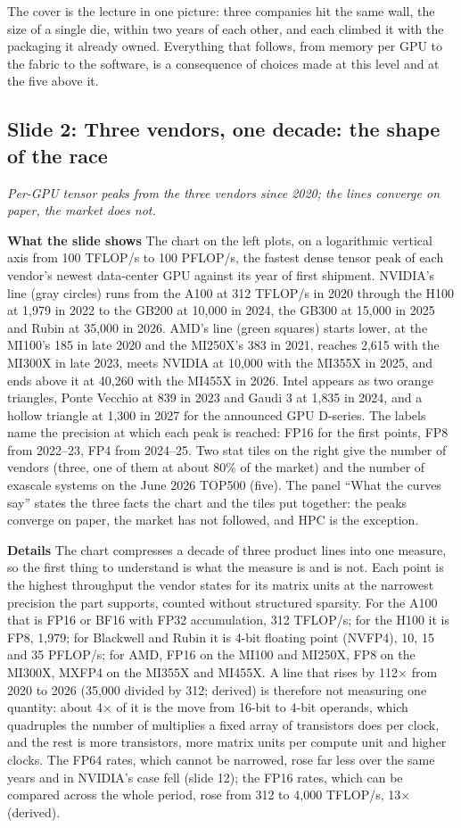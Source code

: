 \documentclass[11pt,letterpaper]{article}
\newcommand{\slide}[3]{%
  \subsection[Slide #1: #2]{Slide #1: #2}%
  {\color{muted}\itshape #3\par}\medskip}
\newcommand{\para}[1]{\medskip\noindent\textbf{#1}\quad}
\newenvironment{intuition}{\begin{tcolorbox}[intuitionbox]}{\end{tcolorbox}}
\begin{document}
\begin{intuition}
The cover is the lecture in one picture: three companies hit the same wall, the size of a single die, within two years of each other, and each climbed it with the packaging it already owned. Everything that follows, from memory per GPU to the fabric to the software, is a consequence of choices made at this level and at the five above it.
\end{intuition}

\slide{2}{Three vendors, one decade: the shape of the race}{Per-GPU tensor peaks from the three vendors since 2020; the lines converge on paper, the market does not.}

\para{What the slide shows} The chart on the left plots, on a logarithmic vertical axis from 100 TFLOP/s to 100 PFLOP/s, the fastest dense tensor peak of each vendor's newest data-center GPU against its year of first shipment. NVIDIA's line (gray circles) runs from the A100 at 312 TFLOP/s in 2020 through the H100 at 1{,}979 in 2022 to the GB200 at 10{,}000 in 2024, the GB300 at 15{,}000 in 2025 and Rubin at 35{,}000 in 2026. AMD's line (green squares) starts lower, at the MI100's 185 in late 2020 and the MI250X's 383 in 2021, reaches 2{,}615 with the MI300X in late 2023, meets NVIDIA at 10{,}000 with the MI355X in 2025, and ends above it at 40{,}260 with the MI455X in 2026. Intel appears as two orange triangles, Ponte Vecchio at 839 in 2023 and Gaudi 3 at 1{,}835 in 2024, and a hollow triangle at 1{,}300 in 2027 for the announced GPU D-series. The labels name the precision at which each peak is reached: FP16 for the first points, FP8 from 2022--23, FP4 from 2024--25. Two stat tiles on the right give the number of vendors (three, one of them at about 80\% of the market) and the number of exascale systems on the June 2026 TOP500 (five). The panel ``What the curves say'' states the three facts the chart and the tiles put together: the peaks converge on paper, the market has not followed, and HPC is the exception.

\para{Details} The chart compresses a decade of three product lines into one measure, so the first thing to understand is what the measure is and is not. Each point is the highest throughput the vendor states for its matrix units at the narrowest precision the part supports, counted without structured sparsity. For the A100 that is FP16 or BF16 with FP32 accumulation, 312 TFLOP/s; for the H100 it is FP8, 1{,}979; for Blackwell and Rubin it is 4-bit floating point (NVFP4), 10, 15 and 35 PFLOP/s; for AMD, FP16 on the MI100 and MI250X, FP8 on the MI300X, MXFP4 on the MI355X and MI455X. A line that rises by 112$\times$ from 2020 to 2026 (35{,}000 divided by 312; derived) is therefore not measuring one quantity: about 4$\times$ of it is the move from 16-bit to 4-bit operands, which quadruples the number of multiplies a fixed array of transistors does per clock, and the rest is more transistors, more matrix units per compute unit and higher clocks. The FP64 rates, which cannot be narrowed, rose far less over the same years and in NVIDIA's case fell (slide 12); the FP16 rates, which can be compared across the whole period, rose from 312 to 4{,}000 TFLOP/s, 13$\times$ (derived).
\end{document}
